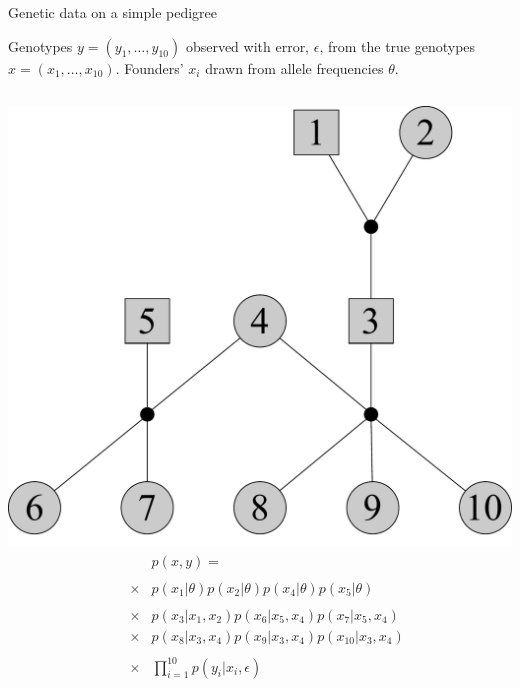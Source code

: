\documentclass[letter,graphicx]{beamer}
\begin{document}
\begin{frame}{Genetic data on a simple pedigree}

Genotypes $y = (y_1,\ldots, y_{10})$ observed with error, $\epsilon$,  from the true genotypes $x=(x_1,\ldots, x_{10})$. Founders' $x_i$ drawn from allele frequencies $\theta$.

\vspace*{-1em}


\begin{columns}
\hspace*{-2em}
\includegraphics[width = 1.60\textwidth]{./images/three-gen-ped-basic.pdf}
\begin{eqnarray*}
 & & p(x,y) = \\
~\\
 &\times &  p(x_1|\theta)p(x_2|\theta)p(x_4|\theta)p(x_5|\theta)  \\
~ \\ 
 & \times& p(x_3|x_1,x_2) p(x_6|x_5,x_4)p(x_7|x_5,x_4)  \\
 & \times& p(x_8|x_3,x_4)p(x_9|x_3,x_4)p(x_{10}|x_3,x_4)  \\
~\\
 & \times& \prod_{i=1}^{10} p(y_i|x_i, \epsilon)
\end{eqnarray*}
\end{columns}
\end{frame}
\end{document}
